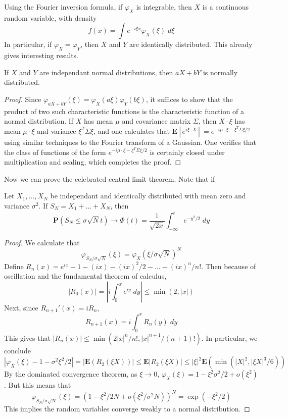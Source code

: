 Using the Fourier inversion formula, if $\varphi_X$ is integrable, then $X$ is a continuous random variable, with density
%
\[ f(x) = \int e^{- i \xi x} \varphi_X(\xi)\; d\xi \]
%
In particular, if $\varphi_X = \varphi_Y$, then $X$ and $Y$ are identically distributed. This already gives interesting results.

\begin{theorem}
    If $X$ and $Y$ are independant normal distributions, then $aX + bY$ is normally distributed.
\end{theorem}
\begin{proof}
    Since $\varphi_{aX+bY}(\xi) = \varphi_X(a \xi) \varphi_Y(b \xi)$, it suffices to show that the product of two such characteristic functions is the characteristic function of a normal distribution. If $X$ has mean $\mu$ and covariance matrix $\Sigma$, then $X \cdot \xi$ has mean $\mu \cdot \xi$ and variance $\xi^T \Sigma \xi$, and one calculates that $\mathbf{E}[e^{i \xi \cdot X}] = e^{- i \mu \cdot \xi - \xi^T \Sigma \xi / 2}$ using similar techniques to the Fourier transform of a Gaussian. One verifies that the class of functions of the form $e^{-i \mu \cdot \xi - \xi^T \Sigma \xi / 2}$ is certainly closed under multiplication and scaling, which completes the proof. 
\end{proof}

Now we can prove the celebrated central limit theorem. Note that if

\begin{theorem}
    Let $X_1, \dots, X_N$ be independant and identically distributed with mean zero and variance $\sigma^2$. If $S_N = X_1 + \dots + X_N$, then
    \[ \mathbf{P}(S_N \leq \sigma \sqrt{N} t) \to \Phi(t) = \frac{1}{\sqrt{2x}} \int_{-\infty}^t e^{-y^2/2}\; dy \]
\end{theorem}
\begin{proof}
    We calculate that
    \[ \varphi_{S_N/\sigma \sqrt{N}}(\xi) = \varphi_X(\xi/\sigma \sqrt{N})^N \]
    Define $R_n(x) = e^{ix} - 1 - (ix) - (ix)^2/2 - \dots - (ix)^n/n!$. Then because of oscillation and the fundamental theorem of calculus,
    \[ |R_0(x)| = \left| i \int_0^x e^{iy}\; dy \right| \leq \min(2,|x|) \]
    Next, since $R_{n+1}'(x) = i R_n$,
    \[ R_{n+1}(x) = i  \int_0^x R_n(y)\; dy \]
    This gives that $|R_n(x)| \leq \min(2|x|^n/n!,|x|^{n+1}/(n+1)!)$. In particular, we conclude
    \[ |\varphi_X(\xi) - 1 - \sigma^2 \xi^2/2| = |\mathbf{E}(R_2(\xi X))| \leq \mathbf{E}|R_2(\xi X)| \leq |\xi|^2 \mathbf{E} \left( \min \left( |X|^2, |\xi X|^3/6 \right) \right) \]
    By the dominated convergence theorem, as $\xi \to 0$, $\varphi_X(\xi) = 1 - \xi^2 \sigma^2/2 + o(\xi^2)$. But this means that
    \[ \varphi_{S_N/\sigma \sqrt{N}}(\xi) = (1 - \xi^2 / 2 N + o(\xi^2/\sigma^2 N))^N = \exp(-\xi^2/2) \]
    This implies the random variables converge weakly to a normal distribution.
\end{proof}


